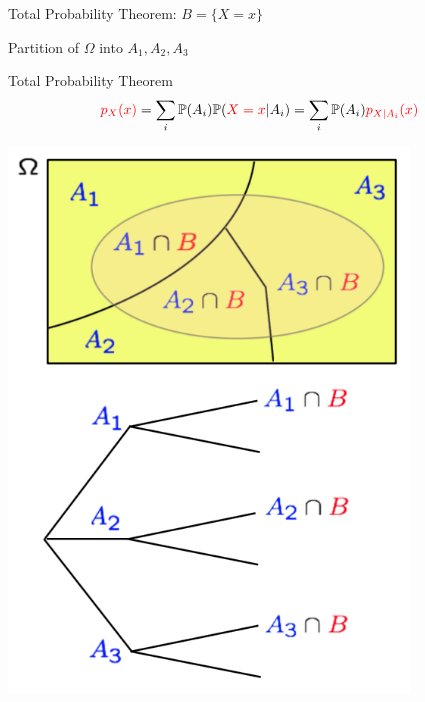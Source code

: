 \documentclass[fleqn,aspectratio=169]{beamer}
\begin{document}
\begin{frame}{Total Probability Theorem: $B = \{X=x \}$}

{
\plitemsep 0.1in
\bci [$\circ$]

\item Partition of $\Omega$ into $A_1,A_2,A_3$


\bigskip
\medskip

\begin{block}{Total Probability Theorem}
$$
{\color{red} p_X(x)} = \sum_{i} \mathbb{P}( A_i ) \mathbb{P}( {\color{red} X=x} | A_i ) = \sum_{i} \mathbb{P}( A_i ) {\color{red} p_{X|A_i}(x)} 
$$
\end{block}

\eci 
}
{
\centering
\includegraphics[width=0.8\textwidth]{L2_total_ex.png}
}

\end{frame}
\end{document}
